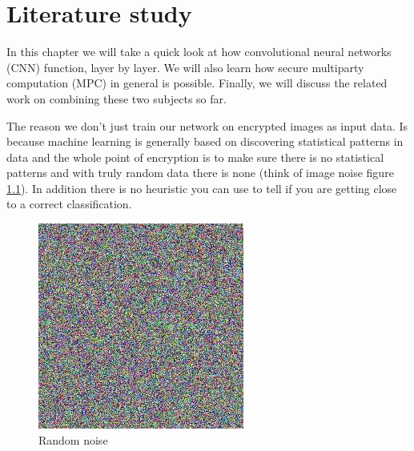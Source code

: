 
\chapter{Literature study}
\label{chapter:literature}
In this chapter we will take a quick look at how convolutional neural networks (CNN) function, layer by layer. We will also learn how secure multiparty computation (MPC) in general is possible. Finally, we will discuss the related work on combining these two subjects so far.

The reason we don't just train our network on encrypted images as input data. Is because machine learning is generally based on discovering statistical patterns in data and the whole point of encryption is to make sure there is no statistical patterns and with truly random data there is none (think of image noise figure \ref{fig:noise}). In addition there is no heuristic you can use to tell if you are getting close to a correct classification.

\begin{figure}[H]
  \centering
  \includegraphics[scale=0.5]{fig/random_noise.jpg}
  \caption{Random noise}
  \label{fig:noise}
\end{figure}

